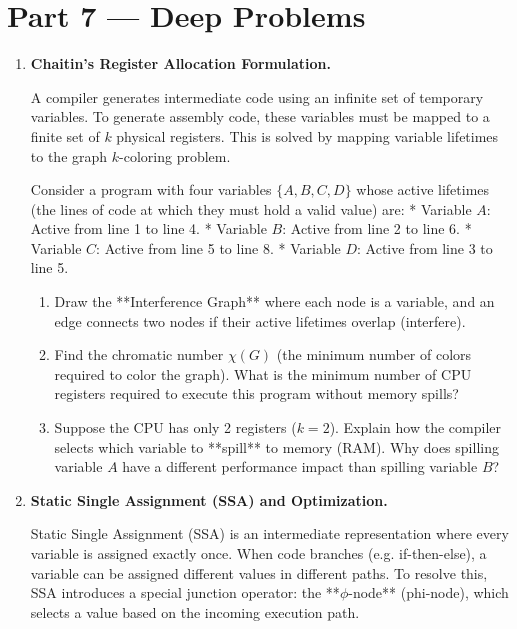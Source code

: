 \documentclass[12pt, a4paper]{book}
\begin{document}
\newpage

\section{Part 7 --- Deep Problems}

\begin{deepbox}
\begin{enumerate}[label=\textbf{D\arabic*.}]
  \item \textbf{Chaitin's Register Allocation Formulation.}
  
        A compiler generates intermediate code using an infinite set of temporary variables.
        To generate assembly code, these variables must be mapped to a finite set of $k$ physical registers.
        This is solved by mapping variable lifetimes to the graph $k$-coloring problem.
        
        Consider a program with four variables $\{A, B, C, D\}$ whose active lifetimes (the lines of code at which they must hold a valid value) are:
        * Variable $A$: Active from line 1 to line 4.
        * Variable $B$: Active from line 2 to line 6.
        * Variable $C$: Active from line 5 to line 8.
        * Variable $D$: Active from line 3 to line 5.
        
        \begin{enumerate}[label=(\alph*)]
          \item Draw the **Interference Graph** where each node is a variable, and an edge connects two nodes if their active lifetimes overlap (interfere).
          \item Find the chromatic number $\chi(G)$ (the minimum number of colors required to color the graph).
                What is the minimum number of CPU registers required to execute this program without memory spills?
          \item Suppose the CPU has only 2 registers ($k=2$).
                Explain how the compiler selects which variable to **spill** to memory (RAM).
                Why does spilling variable $A$ have a different performance impact than spilling variable $B$?
        \end{enumerate}

  \item \textbf{Static Single Assignment (SSA) and Optimization.}
  
        Static Single Assignment (SSA) is an intermediate representation where every variable is assigned exactly once.
        When code branches (e.g. if-then-else), a variable can be assigned different values in different paths. To resolve this, SSA introduces a special junction operator: the **$\phi$-node** (phi-node), which selects a value based on the incoming execution path.
        

\end{enumerate}
\end{deepbox}
\end{document}
